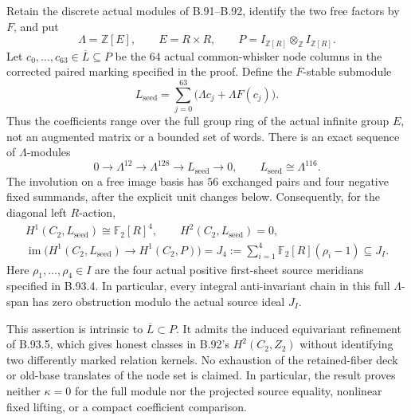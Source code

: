 \label{stmt:B93}
Retain the discrete actual modules of B.91--B.92, identify the two
free factors by $F$, and put
\[
 \Lambda=\mathbb Z[E],\qquad E=R\times R,\qquad
 P=I_{\mathbb Z[R]}\otimes_{\mathbb Z}I_{\mathbb Z[R]}.
\]
Let $c_0,\ldots,c_{63}\in\overline L\subseteq P$ be the $64$
actual common-whisker node columns in the corrected paired marking
specified in the proof. Define the $F$-stable submodule
\begin{equation}\label{eq:B93-seed-module}
 L_{\mathrm{seed}}=
       \sum_{j=0}^{63}\bigl(\Lambda c_j+\Lambda F(c_j)\bigr).
\end{equation}
Thus the coefficients range over the full group ring of the actual
infinite group $E$, not an augmented matrix or a bounded set of words.
There is an exact sequence of $\Lambda$-modules
\begin{equation}\label{eq:B93-free-ranks}
 0\longrightarrow\Lambda^{12}\longrightarrow\Lambda^{128}
     \longrightarrow L_{\mathrm{seed}}\longrightarrow0,
 \qquad L_{\mathrm{seed}}\cong\Lambda^{116}.
\end{equation}
The involution on a free image basis has $56$ exchanged pairs and
four negative fixed summands, after the explicit unit changes below.
Consequently, for the diagonal left $R$-action,
\begin{equation}\label{eq:B93-seed-cohomology}
 \begin{gathered}
 H^1(C_2,L_{\mathrm{seed}})\cong\mathbb F_2[R]^4,
 \qquad H^2(C_2,L_{\mathrm{seed}})=0,\\
 \operatorname{im}\bigl(H^1(C_2,L_{\mathrm{seed}})
                  \longrightarrow H^1(C_2,P)\bigr)
   =J_4:=\sum_{i=1}^4\mathbb F_2[R](\rho_i-1)
   \subseteq J_I.
 \end{gathered}
\end{equation}
Here $\rho_1,\ldots,\rho_4\in I$ are the four actual positive
first-sheet source meridians specified in B.93.4. In particular,
every integral anti-invariant chain in this full $\Lambda$-span
has zero obstruction modulo the actual source ideal $J_I$.

This assertion is intrinsic to $\overline L\subset P$. It admits
the induced equivariant refinement of B.93.5, which gives honest
classes in B.92's $H^2(C_2,Z_2)$ without identifying two differently
marked relation kernels. No exhaustion of the retained-fiber deck
or old-base translates of the node set is claimed. In particular,
the result proves neither $\kappa=0$ for the full module nor the
projected source equality, nonlinear fixed lifting, or a compact
coefficient comparison.

